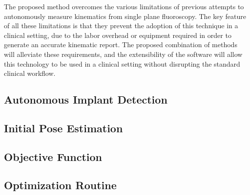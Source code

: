 The proposed method overcomes the various limitations of previous attempts to autonomously measure kinematics from single plane fluoroscopy. The key feature of all these limitations is that they prevent the adoption of this technique in a clinical setting, due to the labor overhead or equipment required in order to generate an accurate kinematic report. The proposed combination of methods will alleviate these requirements, and the extensibility of the software will allow this technology to be used in a clinical setting without disrupting the standard clinical workflow.

\subsection{Autonomous Implant Detection}
\label{sec:implant-detection}


\subsection{Initial Pose Estimation}
\label{sec:pose-estimation}


\subsection{Objective Function}
\label{sec:objective-function}


\subsection{Optimization Routine}
\label{sec:optimization-routine}


